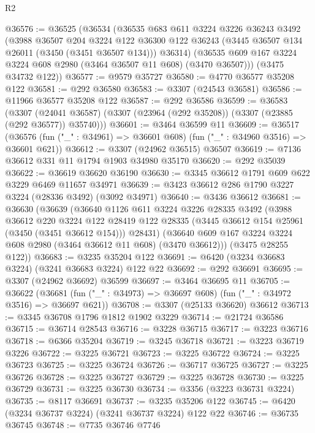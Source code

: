 \begin{lexlean}{R2}
\begin{coremodule}
@36576 := @36525
    (@36534
      (@36535
        @683
        @611
        @3224
        @3226
        @36243
        @3492
        (@3988
          @36507
          @204
          @3224
          @122
          @36300
          @122
          @36243
          (@3445 @36507 @134 @26011 (@3450 (@3451 @36507 @134)))
          @36314)
        (@36535 @609 @167 @3224 @3224 @608 @2980 (@3464 @36507 @11 @608) (@3470 @36507)))
      (@3475 @34732 @122))
@36577 := @9579 @35727
@36580 := @4770 @36577 @35208 @122
@36581 := @292 @36580
@36583 := @3307 (@24543 @36581)
@36586 := @11966 @36577 @35208 @122
@36587 := @292 @36586
@36599 := @36583
    (@3307 (@24041 @36587) (@3307 (@23964 (@292 @35208)) (@3307 (@23885 (@292 @36577)) @35740)))
@36601 := @3464 @36599 @11
@36609 := @36517
    (@36576 (fun ("_" : @34961) => @36601 @608) (fun ("_" : @34960 @3516) => @36601 @621))
@36612 := @3307 (@24962 @36515) @36507
@36619 := @7136 @36612 @331 @11 @1794 @1903 @34980 @35170
@36620 := @292 @35039
@36622 := @36619 @36620 @36190
@36630 := @3345 @36612 @1791 @609 @622 @3229 @6469 @11657 @34971
@36639 := @3423 @36612 @286 @1790 @3227 @3224 (@28336 @3492) (@3092 @34971)
@36640 := @3436 @36612
@36681 := @36630
    (@36639
      (@36640
        @1126
        @611
        @3224
        @3226
        @28335
        @3492
        (@3988
          @36612
          @220
          @3224
          @122
          @28419
          @122
          @28335
          (@3445 @36612 @154 @25961 (@3450 (@3451 @36612 @154)))
          @28431)
        (@36640 @609 @167 @3224 @3224 @608 @2980 (@3464 @36612 @11 @608) (@3470 @36612)))
      (@3475 @28255 @122))
@36683 := @3235 @35204 @122
@36691 := @6420 (@3234 @36683 @3224) (@3241 @36683 @3224) @122 @22
@36692 := @292 @36691
@36695 := @3307 (@24962 @36692) @36599
@36697 := @3464 @36695 @11
@36705 := @36622
    (@36681 (fun ("_" : @34973) => @36697 @608) (fun ("_" : @34972 @3516) => @36697 @621))
@36708 := @3307 (@25133 @36620) @36612
@36713 := @3345 @36708 @1796 @1812 @1902 @3229
@36714 := @21724 @36586
@36715 := @36714 @28543
@36716 := @3228 @36715
@36717 := @3223 @36716
@36718 := @6366 @35204
@36719 := @3245 @36718
@36721 := @3223 @36719 @3226
@36722 := @3225 @36721
@36723 := @3225 @36722
@36724 := @3225 @36723
@36725 := @3225 @36724
@36726 := @36717 @36725
@36727 := @3225 @36726
@36728 := @3225 @36727
@36729 := @3225 @36728
@36730 := @3225 @36729
@36731 := @3225 @36730
@36734 := @3356 (@3223 @36731 @3224)
@36735 := @8117 @36691
@36737 := @3235 @35206 @122
@36745 := @6420 (@3234 @36737 @3224) (@3241 @36737 @3224) @122 @22
@36746 := @36735 @36745
@36748 := @7735 @36746 @7746

\end{coremodule}
\end{lexlean}
